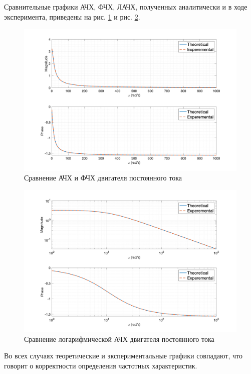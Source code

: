 Сравнительные графики АЧХ, ФЧХ, ЛАЧХ, полученных аналитически и в ходе эксперимента, приведены на рис. \ref{fig:task1_freq_resp_cmp_lin} и рис. \ref{fig:task1_freq_resp_cmp_loglog}.
\begin{figure}[ht!]
    \centering
    \includegraphics[width=\textwidth]{media/plots/task1_freq_resp_cmp_lin.png}
    \caption{Сравнение АЧХ и ФЧХ двигателя постоянного тока}
    \label{fig:task1_freq_resp_cmp_lin}
\end{figure}
\begin{figure}[ht!]
    \centering
    \includegraphics[width=\textwidth]{media/plots/task1_freq_resp_cmp_loglog.png}
    \caption{Сравнение логарифмической АЧХ двигателя постоянного тока}
    \label{fig:task1_freq_resp_cmp_loglog}
\end{figure}

Во всех случаях теоретические и экспериментальные графики совпадают, что 
говорит о корректности определения частотных характеристик. 